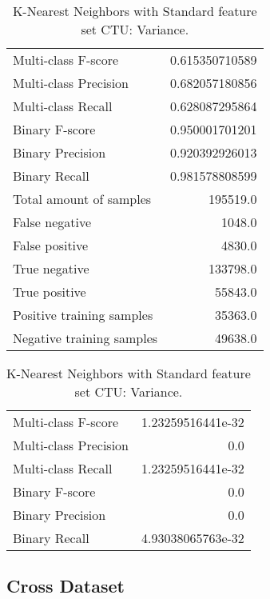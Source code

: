 \begin{table}[H]
\begin{minipage}{0.5\textwidth}
\caption{K-Nearest Neighbors with Standard feature set CTU: Average.}
\centering
\begin{tabular}{l r}
\toprule
Multi-class F-score & 0.615350710589 \\
Multi-class Precision & 0.682057180856 \\
Multi-class Recall & 0.628087295864 \\
\midrule
Binary F-score & 0.950001701201 \\
Binary Precision & 0.920392926013 \\
Binary Recall & 0.981578808599 \\
\midrule
Total amount of samples & 195519.0 \\
False negative & 1048.0 \\
False positive & 4830.0 \\
True negative & 133798.0 \\
True positive & 55843.0 \\
\midrule
Positive training samples & 35363.0 \\
Negative training samples & 49638.0 \\
\bottomrule
\end{tabular}
\end{minipage}
\hfillx
\begin{minipage}{0.5\textwidth}
\caption{K-Nearest Neighbors with Standard feature set CTU: Variance.}
\centering
\begin{tabular}{l r}
\toprule
Multi-class F-score & 1.23259516441e-32 \\
Multi-class Precision & 0.0 \\
Multi-class Recall & 1.23259516441e-32 \\
\midrule
Binary F-score & 0.0 \\
Binary Precision & 0.0 \\
Binary Recall & 4.93038065763e-32 \\
\bottomrule
\end{tabular}
\end{minipage}
\end{table}

\newpage
\subsection{Cross Dataset}

